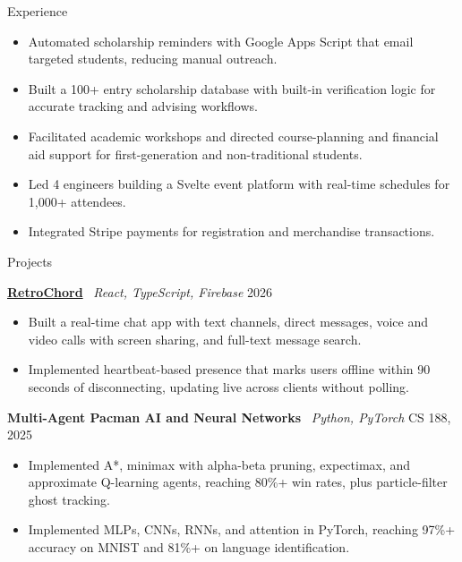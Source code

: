 \documentclass{resume}
\begin{document}
\begin{rSection}{Experience}
\begin{itemize}
  \item Automated scholarship reminders with Google Apps Script that email targeted students, reducing manual outreach.
  \item Built a 100+ entry scholarship database with built-in verification logic for accurate tracking and advising workflows.
  \item Facilitated academic workshops and directed course-planning and financial aid support for first-generation and non-traditional students.
\end{itemize}

\begin{itemize}
  \item Led 4 engineers building a Svelte event platform with real-time schedules for 1,000+ attendees.
  \item Integrated Stripe payments for registration and merchandise transactions.
\end{itemize}

\end{rSection}

\begin{rSection}{Projects}

\textbf{\href{https://github.com/lionelvlv/discord-mockup}{RetroChord}} \textbar\ \textit{React, TypeScript, Firebase} \hfill 2026
\begin{itemize}
  \item Built a real-time chat app with text channels, direct messages, voice and video calls with screen sharing, and full-text message search.
  \item Implemented heartbeat-based presence that marks users offline within 90 seconds of disconnecting, updating live across clients without polling.
\end{itemize}

\textbf{Multi-Agent Pacman AI and Neural Networks} \textbar\ \textit{Python, PyTorch} \hfill CS 188, 2025
\begin{itemize}
  \item Implemented A*, minimax with alpha-beta pruning, expectimax, and approximate Q-learning agents, reaching 80\%+ win rates, plus particle-filter ghost tracking.
  \item Implemented MLPs, CNNs, RNNs, and attention in PyTorch, reaching 97\%+ accuracy on MNIST and 81\%+ on language identification.
\end{itemize}

\end{rSection}
\end{document}
